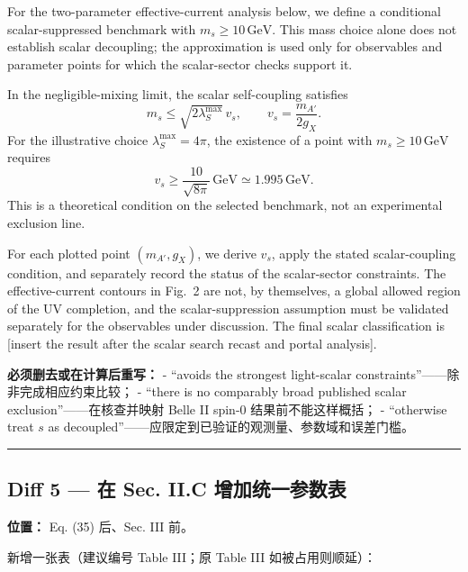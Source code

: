 \documentclass[
]{article}
\begin{document}
For the two-parameter effective-current analysis below, we define a conditional
scalar-suppressed benchmark with \(m_s\geq 10\,\mathrm{GeV}\). This mass choice
alone does not establish scalar decoupling; the approximation is used only for
observables and parameter points for which the scalar-sector checks support it.

In the negligible-mixing limit, the scalar self-coupling satisfies
\[
m_s\leq \sqrt{2\lambda_S^{\max}}\,v_s,
\qquad
v_s=\frac{m_{A'}}{2g_X}.
\]
For the illustrative choice \(\lambda_S^{\max}=4\pi\), the existence
of a point with \(m_s\geq 10\,\mathrm{GeV}\) requires
\[
v_s\geq \frac{10}{\sqrt{8\pi}}\,\mathrm{GeV}
\simeq 1.995\,\mathrm{GeV}.
\]
This is a theoretical condition on the selected benchmark, not an
experimental exclusion line.

For each plotted point \((m_{A'},g_X)\), we derive \(v_s\), apply the
stated scalar-coupling condition, and separately record the status of
the scalar-sector constraints. The effective-current contours in
Fig.~2 are not, by themselves, a global allowed region of the UV
completion, and the scalar-suppression assumption must be validated
separately for the observables under discussion. The final scalar
classification is [insert the result after the scalar search recast
and portal analysis].

\textbf{必须删去或在计算后重写：} - ``avoids the strongest light-scalar
constraints''------除非完成相应约束比较； - ``there is no comparably
broad published scalar exclusion''------在核查并映射 Belle II spin-0
结果前不能这样概括； - ``otherwise treat \(s\) as
decoupled''------应限定到已验证的观测量、参数域和误差门槛。

\begin{center}\rule{0.5\linewidth}{0.5pt}\end{center}

\subsection{Diff 5 --- 在 Sec. II.C
增加统一参数表}\label{diff-5-ux5728-sec.-ii.c-ux589eux52a0ux7edfux4e00ux53c2ux6570ux8868}

\textbf{位置：} Eq. (35) 后、Sec. III 前。

新增一张表（建议编号 Table III；原 Table III 如被占用则顺延）：
\end{document}
